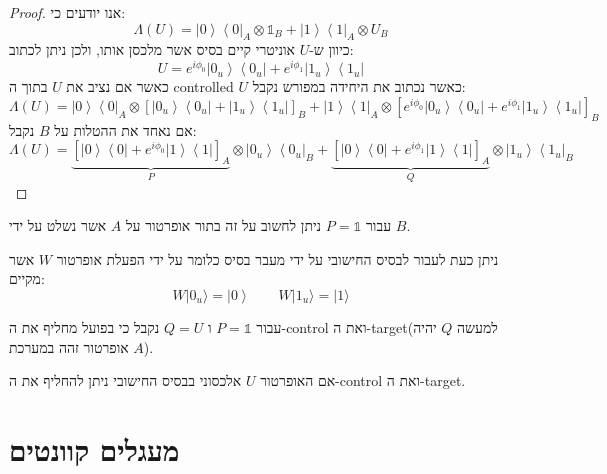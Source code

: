 \documentclass{tstextbook}
\begin{document}
\begin{proof}
אנו יודעים כי:
$$\Lambda\left(U\right)=\left|0\right\rangle\left\langle0\right|_{A}\otimes\mathbb{1}_{B}+\left|1\right\rangle\left\langle1\right|_{A}\otimes U_{B}$$
כיוון ש-\(U\) אוניטרי קיים בסיס אשר מלכסן אותו, ולכן ניתן לכתוב:
$$U=e^{i\phi_{0}}\left|0_{u}\right\rangle\left\langle0_{u}\right|+e^{i\phi_{1}}\left|1_{u}\right\rangle\left\langle1_{u}\right|$$
כאשר אם נציב את \(U\) בתוך ה controlled \(U\) כאשר נכתוב את היחידה במפורש נקבל:
$$\Lambda\left(U\right)=\left|0\right\rangle\left\langle0\right|_{A}\otimes\left[\left|0_{u}\right\rangle\left\langle0_{u}\right|+\left|1_{u}\right\rangle\left\langle1_{u}\right|\right]_{B}+\left|1\right\rangle\left\langle1\right|_{A}\otimes\left[e^{i\phi_{0}}\left|0_{u}\right\rangle\left\langle0_{u}\right|+e^{i\phi_{1}}\left|1_{u}\right\rangle\left\langle1_{u}\right|\right]_{B}$$
אם נאחד את ההטלות על \(B\) נקבל:
$$\Lambda\left(U\right)=\underbrace{ \left[\left|0\right\rangle\left\langle0\right|+e^{i\phi_{0}}\left|1\right\rangle\left\langle1\right|\right]_{A} }_{ P }\otimes\left|0_{u}\right\rangle\left\langle0_{u}\right|_{B}+\underbrace{ \left[\left|0\right\rangle\left\langle0\right|+e^{i\phi_{1}}\left|1\right\rangle\left\langle1\right|\right]_{A} }_{ Q }\otimes\left|1_{u}\right\rangle\left\langle1_{u}\right|_{B}$$

\end{proof}
\begin{corollary}
עבור \(P=\mathbb{1}\) ניתן לחשוב על זה בתור אופרטור על \(A\) אשר נשלט על ידי \(B\).

\end{corollary}
\begin{corollary}
ניתן כעת לעבור לבסיס החישובי על ידי מעבר בסיס כלומר על ידי הפעלת אופרטור \(W\) אשר מקיים:
$$W|0_{u}\rangle=\left|0\right\rangle \qquad W|1_{u}\rangle=|1\rangle$$

\end{corollary}
\begin{proposition}
עבור \(P=\mathbb{1}\) ו \(Q=U\) נקבל כי בפועל מחליף את ה-control ואת ה-target(למעשה \(Q\) יהיה אופרטור זהה במערכת \(A\)).

\end{proposition}
\begin{corollary}
אם האופרטור \(U\) אלכסוני בבסיס החישובי ניתן להחליף את ה-control ואת ה-target.

\end{corollary}
\section{מעגלים קוונטים}
\end{document}
